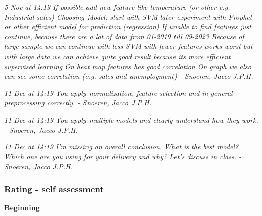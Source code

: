 \documentclass[a4paper, 11pt]{article}
\begin{document}
\begin{mdframed}[backgroundcolor=gray!20, linecolor=black, linewidth=0pt, leftmargin=1cm, rightmargin=1cm, innertopmargin=10pt, innerbottommargin=10pt]
  \itshape
  5 Nov at 14:19 \smallbreak
  If possible add new feature like temperature (or other e.g. Industrial sales)
Choosing Model: start with SVM later experiment with Prophet or other efficient model for prediction (regression)
If unable to find features just continue, because there are a lot of data from 01-2019 till 09-2023
Because of large sample we can continue with less SVM with fewer features works worst but with large data we can achieve quite good result because its more efficient supervised learning
On heat map features has good correlation
On graph we also can see some correlation (e.g. sales and unemployment)\smallbreak
- Snoeren, Jacco J.P.H.
\end{mdframed}

\begin{mdframed}[backgroundcolor=gray!20, linecolor=black, linewidth=0pt, leftmargin=1cm, rightmargin=1cm, innertopmargin=10pt, innerbottommargin=10pt]
  \itshape
  11 Dec at 14:19 \smallbreak
  You apply normalization, feature selection and in general preprocessing correctly.\smallbreak
- Snoeren, Jacco J.P.H.
\end{mdframed}

\begin{mdframed}[backgroundcolor=gray!20, linecolor=black, linewidth=0pt, leftmargin=1cm, rightmargin=1cm, innertopmargin=10pt, innerbottommargin=10pt]
  \itshape
  11 Dec at 14:19 \smallbreak
  You apply multiple models and clearly understand how they work.\smallbreak
- Snoeren, Jacco J.P.H.
\end{mdframed}

\begin{mdframed}[backgroundcolor=gray!20, linecolor=black, linewidth=0pt, leftmargin=1cm, rightmargin=1cm, innertopmargin=10pt, innerbottommargin=10pt]
  \itshape
  11 Dec at 14:19 \smallbreak
  I'm missing an overall conclusion. What is the best model? Which one are you using for your delivery and why? Let's discuss in class. \smallbreak
- Snoeren, Jacco J.P.H.
\end{mdframed}


\subsubsection{Rating - self assessment}
\textbf{Beginning} 
\end{document}
